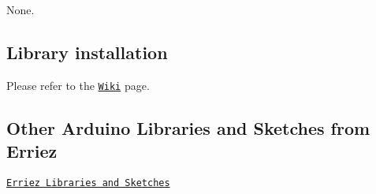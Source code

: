 \begin{DoxyItemize}
\item None.
\end{DoxyItemize}

\subsection*{Library installation}

Please refer to the \href{https://github.com/Erriez/ErriezArduinoLibrariesAndSketches/wiki}{\tt Wiki} page.

\subsection*{Other Arduino Libraries and Sketches from Erriez}


\begin{DoxyItemize}
\item \href{https://github.com/Erriez/ErriezArduinoLibrariesAndSketches}{\tt Erriez Libraries and Sketches} 
\end{DoxyItemize}